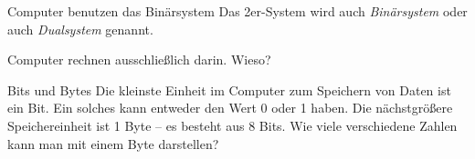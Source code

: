 \documentclass{../../../zirkelblatt}
\begin{document}
\begin{aufgabe}{Computer benutzen das Binärsystem}
Das 2er-System wird auch \emph{Binärsystem} oder auch \emph{Dualsystem} genannt.

Computer rechnen ausschließlich darin. Wieso?
\end{aufgabe}

\vspace{2cm}

\begin{aufgabe}{Bits und Bytes}
Die kleinste Einheit im Computer zum Speichern von Daten ist ein Bit.
Ein solches kann entweder den Wert 0 oder 1 haben.
Die nächstgrößere Speichereinheit ist 1 Byte -- es besteht aus 8 Bits.
Wie viele verschiedene Zahlen kann man mit einem Byte darstellen?
\end{aufgabe}

\pagebreak
\end{document}
